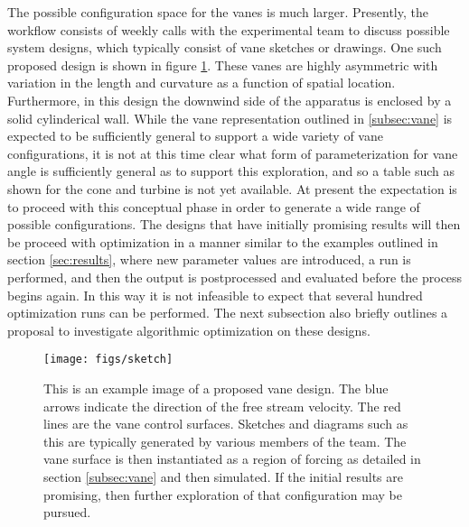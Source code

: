 The possible configuration space for the vanes is much larger. 
Presently, the
workflow consists of weekly calls with the experimental team to discuss
possible system designs, which typically consist of vane sketches or
drawings. One such proposed design is shown in figure \ref{fig:sketch}. 
These vanes are highly asymmetric with variation in the length and 
curvature as a function of spatial location. Furthermore, in this design 
the downwind side of the apparatus is enclosed by a solid cylinderical wall. 
While the vane representation outlined in \ref{subsec:vane} is expected to be 
sufficiently general to support a wide variety of vane configurations, it is not at this time
clear what form of parameterization for vane angle is sufficiently general as to support 
this exploration, and so a table such as shown for the cone and turbine is not yet available.
At present the expectation is to proceed with this conceptual phase in order to generate a wide
range of possible configurations. The designs that have initially promising results will then be 
proceed with optimization in a manner
similar to the examples outlined in section \ref{sec:results}, where new
parameter values are introduced, a run is performed, and then the output
is postprocessed and evaluated before the process begins again. 
In this way it is not infeasible to expect that several hundred 
optimization runs can be performed. The next subsection also briefly outlines a proposal 
to investigate algorithmic optimization on these designs. 

\begin{figure}[htb]
 \centering
 \texttt{[image: figs/sketch]}
 \caption{This is an example image of a proposed vane design. The blue arrows indicate the
   direction of the free stream velocity. The red lines are the vane control surfaces. Sketches
   and diagrams such as this are typically generated by various members of
   the team. The vane surface is then instantiated as a region of forcing as detailed in 
   section \ref{subsec:vane} and  then simulated. If the initial results are promising, then
   further exploration of that configuration may be pursued.}
 \label{fig:sketch}
\end{figure}




